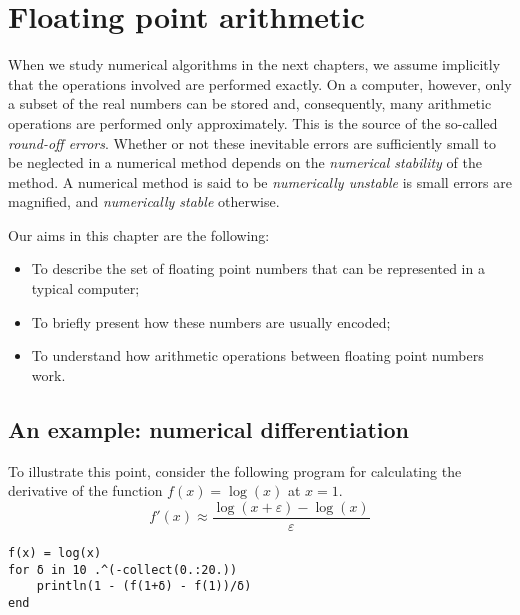 \chapter{Floating point arithmetic}%
\label{cha:rounding_errors}
\minitoc

When we study numerical algorithms in the next chapters,
we assume implicitly that the operations involved are performed exactly.
On a computer, however, only a subset of the real numbers can be stored and,
consequently, many arithmetic operations are performed only approximately.
This is the source of the so-called \emph{round-off errors}.
Whether or not these inevitable errors are sufficiently small to be neglected in a numerical method
depends on the \emph{numerical stability} of the method.
A numerical method is said to be \emph{numerically unstable} is small errors are magnified,
and \emph{numerically stable} otherwise.



Our aims in this chapter are the following:
\begin{itemize}
    \item To describe the set of floating point numbers that can be represented in a typical computer;
    \item To briefly present how these numbers are usually encoded;
    \item To understand how arithmetic operations between floating point numbers work.
\end{itemize}

\section{An example: numerical differentiation}%
To illustrate this point,
consider the following program for calculating the derivative of the function $f(x) = \log(x)$ at $x = 1$.
\[
    f'(x) \approx \frac{\log(x + \varepsilon) - \log(x)}{\varepsilon}
\]
\begin{verbatim}
f(x) = log(x)
for δ in 10 .^(-collect(0.:20.))
    println(1 - (f(1+δ) - f(1))/δ)
end
\end{verbatim}

\begin{exercise}
\end{exercise}


